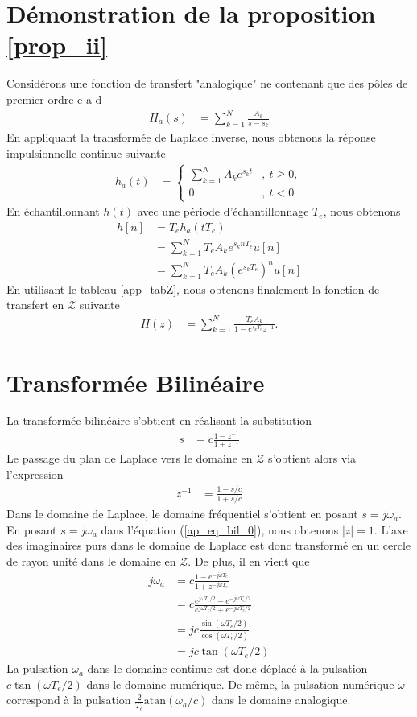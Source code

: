 \documentclass[11pt,a4paper]{IEEEtran}
\begin{document}
\section{Démonstration de la proposition \ref{prop_ii}}
\label{a_prop_ii}
Considérons une fonction de transfert "analogique" ne contenant que des pôles de premier ordre c-a-d
\begin{align}
H_a(s)&=\sum_{k=1}^{N} \frac{A_k}{s-s_k}
\end{align}
En appliquant la transformée de Laplace inverse, nous obtenons la réponse impulsionnelle continue suivante
\begin{align}
h_a(t)&=\left\{
\begin{array}{lc}
\sum_{k=1}^{N} A_k e^{s_k t}&,~t\ge 0,\\
0&,~t<0
\end{array}\right.  
\end{align}
En échantillonnant $h(t)$ avec une période d'échantillonnage $T_e$, nous obtenons
\begin{align}
h[n]&=T_e h_a(t T_e)\\
&=\sum_{k=1}^{N}T_e A_k e^{s_k n T_e}u[n]\\
&=\sum_{k=1}^{N}T_e A_k (e^{s_k T_e})^{n}u[n]
\end{align}
En utilisant le tableau \ref{app_tabZ}, nous obtenons finalement la fonction de transfert en $\mathcal{Z}$ suivante
\begin{align}
H(z)&=\sum_{k=1}^{N} \frac{T_e A_k}{1-e^{s_kT_e}z^{-1}}.
\end{align}

\section{Transformée Bilinéaire}
\label{ap_tf}
La transformée bilinéaire s'obtient en réalisant la substitution
\begin{align}
s&=c\frac{1-z^{-1}}{1+z^{-1}}
\end{align}
Le passage du plan de Laplace vers le domaine en $\mathcal{Z}$ s'obtient alors via l'expression
\begin{align}
z^{-1}&=\frac{1-s/c}{1+s/c}\label{ap_eq_bil_0}
\end{align}
Dans le domaine de Laplace, le domaine fréquentiel s'obtient en posant $s=j\omega_a$. En posant $s=j\omega_a$ dans l'équation (\ref{ap_eq_bil_0}), nous obtenons $|z|=1$. L'axe des imaginaires purs dans le domaine de Laplace est donc transformé en un cercle de rayon unité dans le domaine en $\mathcal{Z}$. De plus, il en vient que 
\begin{align}
j\omega_a&=c\frac{1-e^{-j\omega T_e}}{1+z^{-j\omega T_e}}\\
&=c\frac{e^{j\omega T_e/2}-e^{-j\omega T_e/2}}{e^{j\omega T_e/2}+e^{-j\omega T_e/2}}\\
&=jc\frac{\sin(\omega T_e/2)}{\cos(\omega T_e/2)}\\
&=jc\tan(\omega T_e/2)
\end{align}
La pulsation $\omega_a$ dans le domaine continue est donc déplacé à la pulsation $c\tan(\omega T_e/2)$ dans le domaine numérique. De même, la pulsation numérique $\omega$ correspond à la pulsation $\frac{2}{T_e}\textrm{atan}(\omega_a /c)$ dans le domaine analogique.
\end{document}
